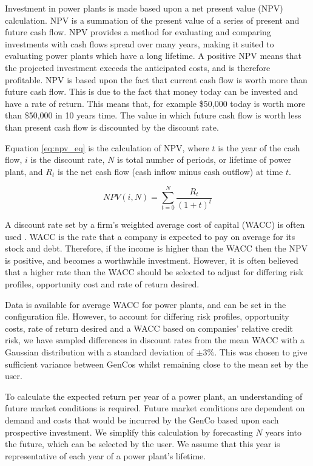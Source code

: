 Investment in power plants is made based upon a net present value (NPV) calculation. NPV is a summation of the present value of a series of present and future cash flow. NPV provides a method for evaluating and comparing investments with cash flows spread over many years, making it suited to evaluating power plants which have a long lifetime. A positive NPV means that the projected investment exceeds the anticipated costs, and is therefore profitable. {\color{red}NPV is based upon the fact that current cash flow is worth more than future cash flow. This is due to the fact that money today can be invested and have a rate of return. This means that, for example \$50,000 today is worth more than \$50,000 in 10 years time. The value in which future cash flow is worth less than present cash flow is discounted by the discount rate.}

Equation \ref{eq:npv_eq} is the calculation of NPV, where $t$ is the year of the cash flow, $i$ is the discount rate, $N$ is total number of periods, or lifetime of power plant, and $R_t$ is the net cash flow (cash inflow minus cash outflow) at time $t$.

\begin{equation} \label{eq:npv_eq}
NPV(i, N) = \sum_{t=0}^{N}\frac{R_t}{(1+t)^t}
\end{equation}

A discount rate set by a firm's weighted average cost of capital (WACC) is often used \cite{KincheloeStephenC1990TWAC}. WACC is the rate that a company is expected to pay on average for its stock and debt. Therefore, if the income is higher than the WACC then the NPV is positive, and becomes a worthwhile investment. However, it is often believed that a higher rate than the WACC should be selected to adjust for differing risk profiles, opportunity cost and rate of return desired.

Data is available for average WACC for power plants, and can be set in the configuration file. However, to account for differing risk profiles, opportunity costs, rate of return desired and a WACC based on companies' relative credit risk, we have sampled differences in discount rates from the mean WACC with a Gaussian distribution with a standard deviation of $\pm3\%$. This was chosen to give sufficient variance between GenCos whilst remaining close to the mean set by the user.

To calculate the expected return per year of a power plant, an understanding of future market conditions is required. Future market conditions are dependent on demand and costs that would be incurred by the GenCo based upon each prospective investment. We simplify this calculation by forecasting $N$ years into the future, which can be selected by the user. We assume that this year is representative of each year of a power plant's lifetime.

